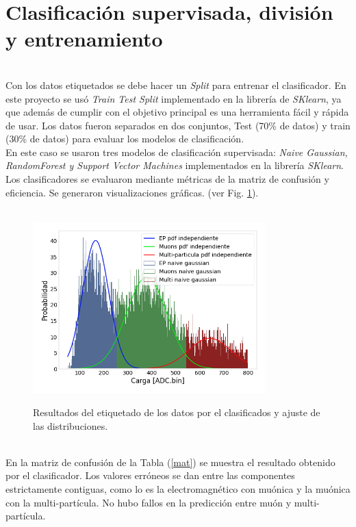 \section{Clasificación supervisada, división y entrenamiento}\\

Con los datos etiquetados se debe hacer un \textit{Split} para entrenar el clasificador. En este proyecto se usó \textit{Train Test Split} implementado en la librería de \textit{SKlearn}, ya que además de cumplir con el objetivo principal es una herramienta fácil y rápida de usar. Los datos fueron separados en dos conjuntos, Test (70\% de datos) y train (30\% de datos) para evaluar los modelos de clasificación. \\

En este caso se usaron tres modelos de clasificación supervisada: \textit{Naive Gaussian, RandomForest y Support Vector Machines} implementados en la librería \textit{SKlearn}. Los clasificadores se evaluaron mediante métricas de la matriz de confusión y eficiencia. Se generaron visualizaciones gráficas. (ver Fig. \ref{seis}).\\
\\

\begin{figure}[h]
\begin{center}
\caption{Resultados del etiquetado de los datos por el clasificados y ajuste de las distribuciones.}
\includegraphics[width=0.8\textwidth]{Figures/imagenes/6ta.png}

\label{seis}
\end{center}
\end{figure}\\


En la matriz de confusión de la Tabla (\ref{mat}) se muestra el resultado obtenido por el clasificador. Los valores erróneos se dan entre las componentes estrictamente contiguas, como lo es la electromagnético con muónica y la muónica con la multi-partícula. No hubo fallos en la predicción entre muón y multi-partícula. \\

